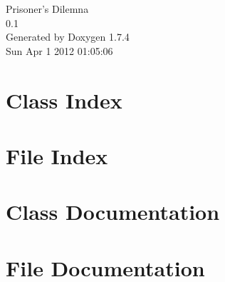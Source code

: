 \documentclass[a4paper]{book}
\begin{document}
\hypersetup{pageanchor=false}
\begin{titlepage}
\vspace*{7cm}
\begin{center}
{\Large Prisoner's Dilemna \\[1ex]\large 0.1 }\\
\vspace*{1cm}
{\large Generated by Doxygen 1.7.4}\\
\vspace*{0.5cm}
{\small Sun Apr 1 2012 01:05:06}\\
\end{center}
\end{titlepage}
\clearemptydoublepage
{}
\tableofcontents
\clearemptydoublepage
{}
\hypersetup{pageanchor=true}
\chapter{Class Index}

\chapter{File Index}

\chapter{Class Documentation}









\chapter{File Documentation}


























\printindex
\end{document}
